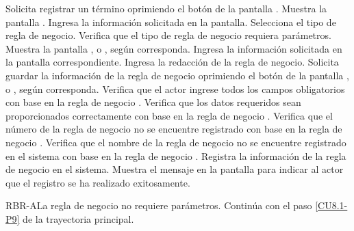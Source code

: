 	\begin{UCtrayectoria}
		\UCpaso[\UCactor] Solicita registrar un término oprimiendo el botón  de la pantalla .
		\UCpaso[\UCsist] Muestra la pantalla .
		\UCpaso[\UCactor] Ingresa la información solicitada en la pantalla. \label{CU8.1-P3}
		\UCpaso[\UCactor] Selecciona el tipo de regla de negocio.
		\UCpaso[\UCsist] Verifica que el tipo de regla de negocio requiera parámetros. 
		\UCpaso[\UCsist] Muestra la pantalla ,  o , según corresponda.
		\UCpaso[\UCsist] Ingresa la información solicitada en la pantalla correspondiente.
		\UCpaso[\UCsist] Ingresa la redacción de la regla de negocio. \label{CU8.1-P9}
		\UCpaso[\UCactor] Solicita guardar la información de la regla de negocio oprimiendo el botón  de la pantalla ,  o , según corresponda. 
		\UCpaso[\UCsist] Verifica que el actor ingrese todos los campos obligatorios con base en la regla de negocio . 
		\UCpaso[\UCsist] Verifica que los datos requeridos sean proporcionados correctamente con base en la regla de negocio .  
		\UCpaso[\UCsist] Verifica que el número de la regla de negocio no se encuentre registrado con base en la regla de negocio . 
		\UCpaso[\UCsist] Verifica que el nombre de la regla de negocio no se encuentre registrado en el sistema con base en la regla de negocio . 
		\UCpaso[\UCsist] Registra la información de la regla de negocio en el sistema.
		\UCpaso[\UCsist] Muestra el mensaje  en la pantalla  para indicar al actor que el registro se ha realizado exitosamente.
	\end{UCtrayectoria}		
	
	\begin{UCtrayectoriaA}{RBR-A}{La regla de negocio no requiere parámetros.}
		\UCpaso[\UCactor] Continúa con el paso \ref{CU8.1-P9} de la trayectoria principal.
	\end{UCtrayectoriaA}
	
